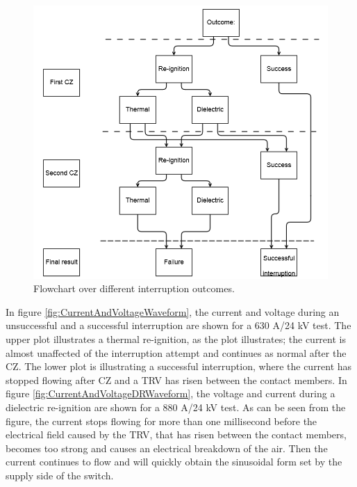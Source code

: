 \documentclass[10pt,b5paper,twoside]{article}
\begin{document}
\begin{figure} [H]
\centering
\includegraphics[scale=0.60]{Bilder/Results/outcomeinterruption.png}
\caption{Flowchart over different interruption outcomes.} \label{fig:flowchart}
\end{figure}

In figure \ref{fig:CurrentAndVoltageWaveform}, the current and voltage during an unsuccessful and a successful interruption are shown for a 630 A/24 kV test. The upper plot illustrates a thermal re-ignition, as the plot illustrates; the current is almost unaffected of the interruption attempt and continues as normal after the CZ. The lower plot is illustrating a successful interruption, where the current has stopped flowing after CZ and a TRV has risen between the contact members. In figure \ref{fig:CurrentAndVoltageDRWaveform}, the voltage and current during a dielectric re-ignition are shown for a 880 A/24 kV test. As can be seen from the figure, the current stops flowing for more than one millisecond before the electrical field caused by the TRV, that has risen between the contact members, becomes too strong and causes an electrical breakdown of the air. Then the current continues to flow and will quickly obtain the sinusoidal form set by the supply side of the switch. 
\end{document}
